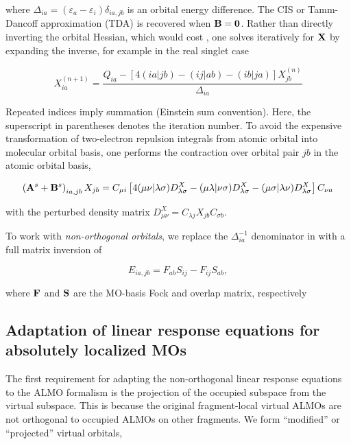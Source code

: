 where \(\Delta_{ia} = (\varepsilon_{a} - \varepsilon_{i}) \delta_{ia,jb}\) is an orbital energy difference. The CIS or Tamm-Dancoff approximation (TDA) is recovered when \(\mathbf{B} = \mathbf{0}\). Rather than directly inverting the orbital Hessian, which would cost , one solves iteratively for \(\mathbf{X}\) by expanding the inverse, for example in the real singlet case

\begin{equation}
  \label{eq:update}
  X_{ia}^{(n+1)}
  =
  \frac{Q_{ia} - \left[4(ia|jb) - (ij|ab) - (ib|ja)\right] X_{jb}^{(n)}}
       {\Delta_{ia}}
\end{equation}

Repeated indices imply summation (Einstein sum convention). Here, the superscript in parentheses denotes the iteration number. To avoid the expensive transformation of two-electron repulsion integrals from atomic orbital into molecular orbital basis, one performs the contraction over orbital pair \(jb\) in the atomic orbital basis,

\begin{equation}
  \left(\mathbf{A}^{s} + \mathbf{B}^{s}\right)_{ia,jb} X_{jb}
  =
  C_{\mu i}
  \left[
    4 (\mu\nu|\lambda\sigma) D_{\lambda\sigma}^{X}
    - (\mu\lambda|\nu\sigma) D_{\lambda\sigma}^{X}
    - (\mu\sigma|\lambda\nu) D_{\lambda\sigma}^{X}
  \right]
  C_{\nu a}
\end{equation}

with the perturbed density matrix \(D_{\mu\nu}^{X} = C_{\lambda j} X_{jb} C_{\sigma b}\).

To work with \emph{non-orthogonal orbitals}, we replace the \(\Delta_{ia}^{-1}\) denominator in  with a full matrix inversion of

\begin{equation}
  \label{eq:energy-denominator}
  E_{ia,jb} = F_{ab}S_{ij} - F_{ij}S_{ab},
\end{equation}

where \(\mathbf{F}\) and \(\mathbf{S}\) are the MO-basis Fock and overlap matrix, respectively

\subsection{Adaptation of linear response equations for absolutely localized MOs}
\label{ssec:almo-adaptation}

The first requirement for adapting the non-orthogonal linear response equations to the ALMO formalism is the projection of the occupied subspace from the virtual subspace. This is because the original fragment-local virtual ALMOs are not orthogonal to occupied ALMOs on other fragments. We form ``modified'' or ``projected'' virtual orbitals,

